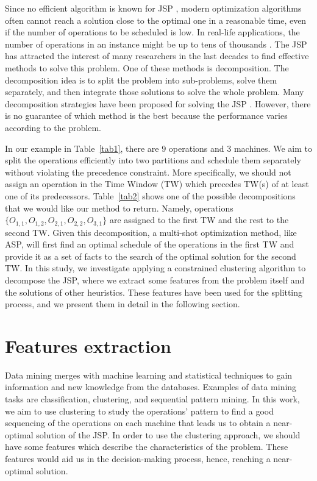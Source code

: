 \documentclass[runningheads]{llncs}
\begin{document}
Since no efficient algorithm is known for JSP \cite{garey1976complexity}, 
modern optimization algorithms often cannot reach a solution close to the optimal one in a reasonable time, even if the number of operations to be scheduled is low. In real-life applications, the number of operations in an instance might be up to tens of thousands \cite{zhang2010hybrid}. The JSP has attracted the interest of many researchers in the last decades to find effective methods to solve this problem. One of these methods is decomposition. The decomposition idea is to split the problem into sub-problems, solve them separately, and then integrate those solutions to solve the whole problem. Many decomposition strategies have been proposed for solving the JSP  \cite{zhai2014decomposition,singer2001decomposition,ovacik2012decomposition,uzsoy2000performance}. However, there is no guarantee of which method is the best because the performance varies according to the problem.

In our example in Table~\ref{tab1}, there are $9$ operations and $3$ machines. We aim to split the operations efficiently into two partitions and schedule them separately without violating the precedence constraint. More specifically, we should not assign an operation in the Time Window (TW) which precedes TW(s) of at least one of its predecessors. Table~\ref{tab2} shows one of the possible decompositions that we would like our method to return. Namely, operations $\{ O_{1,1}, O_{1,2}, O_{2,1}, O_{2,2}, O_{3,1} \}$ are assigned to the first TW and the rest to the second TW. Given this decomposition, a multi-shot optimization method, like ASP, will first find an optimal schedule of the operations in the first TW and provide it as a set of facts to the search of the optimal solution for the second TW. In this study, we investigate applying a constrained clustering algorithm to decompose the JSP, where we extract some features from the problem itself and the solutions of other heuristics. These features have been used for the splitting process, and we present them in detail in the following section.

\section{Features extraction}
\label{sec:features}
Data mining merges with machine learning and statistical techniques to gain information and new knowledge from the databases\cite{ismail2012production,nasiri2019data}. Examples of data mining tasks are classification, clustering, and sequential pattern mining. In this work, we aim to use clustering to study the operations' pattern to find a good sequencing of the operations on each machine that leads us to obtain a near-optimal solution of the JSP. In order to use the clustering approach, we should have some features which describe the characteristics of the problem. These features would aid us in the decision-making process, hence, reaching a near-optimal solution. \\
\end{document}
